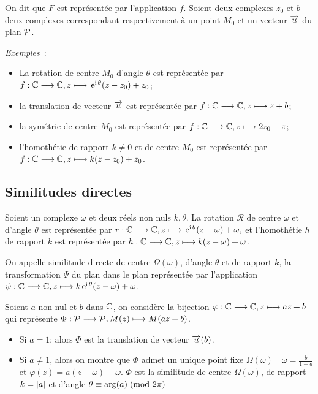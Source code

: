 On dit que \(F\) est représentée par l'application \(f\). Soient deux complexes 
\(z_0\) et \(b\) deux complexes correspondant respectivement à un point \(M_0\) 
et un vecteur \(\vect{u}\) du plan \(\P\).

\emph{Exemples}~:
\begin{itemize}
  \item La rotation de centre \(M_0\) d'angle \(\theta\) est représentée par 
    \(\fonctionL{f}{\C}{\C}{z}{\expc{}{\theta}(z-z_0)  + z_0}\);
  \item la translation de vecteur \(\vect{u}\) est représentée par 
    \(\fonctionL{f}{\C}{\C}{z}{z + b}\);
  \item la symétrie de centre \(M_0\) est représentée par 
    \(\fonctionL{f}{\C}{\C}{z}{2z_0-z}\);
  \item l'homothétie de rapport \(k\neq 0\) et de centre \(M_0\) est 
    représentée par \(\fonctionL{f}{\C}{\C}{z}{k(z-z_0) + z_0}\).
\end{itemize}

\subsection{Similitudes directes}
\label{subsec:simdirecte}

Soient un complexe \(\omega\) et deux réels non nuls \(k, \theta \). La rotation 
\(\mathcal{R}\) de centre \(\omega\) et d'angle \(\theta\) est représentée par 
\(\fonctionL{r}{\C}{\C}{z}{\expc{}{\theta}(z-\omega) + \omega},\) et 
l'homothétie \(h\) de rapport \(k\) est représentée par 
\(\fonctionL{h}{\C}{\C}{z}{k(z-\omega) + \omega}\).

\begin{defdef}
  On appelle similitude directe de centre \(\Omega(\omega)\), d'angle 
  \(\theta\) et de rapport \(k\), la transformation \(\Psi\) du plan 
  dans le plan représentée par l'application 
  \(\fonctionL{\psi}{\C}{\C}{z}{\expc{k}{\theta}(z-\omega) + \omega}\).
\end{defdef}
Soient \(a\) non nul et \(b\) dans \(\C\), on considère la bijection 
\(\fonctionL{\varphi}{\C}{\C}{z}{az + b}\) qui représente 
\(\fonctionL{\Phi}{\P}{\P}{M(z)}{M(az + b)}\).

\begin{itemize}
  \item Si \(a = 1\); alors  \(\Phi\) est la translation de vecteur 
    \(\vect{u}(b)\).
  \item Si \(a \neq 1\), alors on montre que \(\Phi\) admet un unique point 
    fixe \(\Omega(\omega) \quad \omega = \frac{b}{1-a}\) et \(\varphi(z) = 
    a(z-\omega) + \omega\).
    \(\Phi\) est la similitude de centre \(\Omega(\omega)\), de rapport \(k 
    = \abs{a}\) et d'angle \(\congru{\theta}{\arg(a)}{2\pi}\)
\end{itemize}

